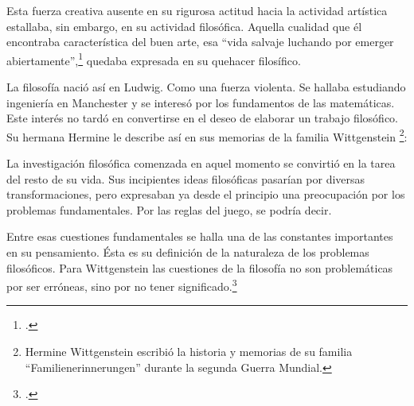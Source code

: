 Esta fuerza creativa ausente en su rigurosa actitud hacia la actividad artística
estallaba, sin embargo, en su actividad filosófica. Aquella cualidad que él
encontraba característica del buen arte, esa ``vida salvaje luchando por emerger
abiertamente'',\footcite[cf.˜][loc.˜]{monk} quedaba expresada en su quehacer
filosífico.


La filosofía nació así en Ludwig. Como una fuerza violenta. Se hallaba
estudiando ingeniería en Manchester y se interesó por los fundamentos de las
matemáticas. Este interés no tardó en convertirse en el deseo de elaborar un
trabajo filosófico. Su hermana Hermine le describe así en sus memorias de la
familia Wittgenstein
\footnote{Hermine Wittgenstein escribió la historia y memorias de su familia
  ``Familienerinnerungen'' durante la segunda Guerra Mundial.}:


La investigación filosófica comenzada en aquel momento se convirtió en la tarea
del resto de su vida. Sus incipientes ideas filosóficas pasarían por diversas
transformaciones, pero expresaban ya desde el principio una preocupación por los
problemas fundamentales. Por las reglas del juego, se podría decir.


Entre esas cuestiones fundamentales se halla una de las constantes importantes
en su pensamiento. Ésta es su definición de la naturaleza de los problemas
filosóficos. Para Wittgenstein las cuestiones de la filosofía no son
problemáticas por ser erróneas, sino por no tener
significado.\footcite[cf.~][4.003]{tractatus}

